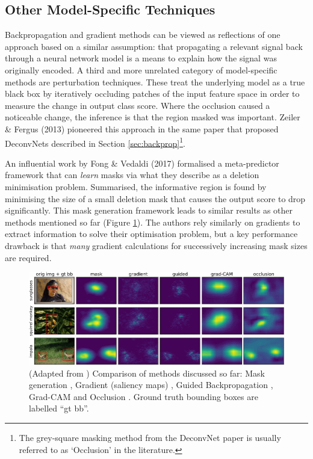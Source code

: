 \documentclass[main]{subfiles}
\begin{document}

\subsection{Other Model-Specific Techniques} \label{sec:otherms}

Backpropagation and gradient methods can be viewed as reflections of one approach based on a similar assumption: that propagating a relevant signal back through a neural network model is a means to explain how the signal was originally encoded. A third and more unrelated category of model-specific methods are perturbation techniques. These treat the underlying model as a true black box by iteratively occluding patches of the input feature space in order to measure the change in output class score. Where the occlusion caused a noticeable change, the inference is that the region masked was important. Zeiler \& Fergus (2013) \cite{zeilerfergus2013} pioneered this approach in the same paper that proposed DeconvNets described in Section \ref{sec:backprop}\footnote{The grey-square masking method from the DeconvNet paper is usually referred to as `Occlusion' in the literature.}. 


An influential work by Fong \& Vedaldi (2017) \cite{perturb_fong} formalised a meta-predictor framework that can \textit{learn} masks via what they describe as a deletion minimisation problem. Summarised, the informative region is found by minimising the size of a small deletion mask that causes the output score to drop significantly. This mask generation framework leads to similar results as other methods mentioned so far (Figure \ref{comparisonimg}). The authors rely similarly on gradients to extract information to solve their optimisation problem, but a key performance drawback is that \textit{many} gradient calculations for successively increasing mask sizes are required.



\begin{figure}[h]
\centering
\includegraphics[scale=0.65]{perturb.png}
\caption{(Adapted from \cite{perturb_fong}) Comparison of methods discussed so far: Mask generation \cite{perturb_fong}, Gradient (saliency maps) \cite{saliencyII}, Guided Backpropagation \cite{springenberg}, Grad-CAM \cite{gradcam} and Occlusion \cite{zeilerfergus2013}. Ground truth bounding boxes are labelled ``gt bb''.}
\label{comparisonimg}
\end{figure}
\end{document}
